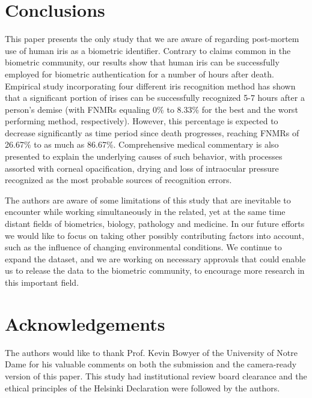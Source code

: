 \documentclass[10pt,twocolumn,letterpaper]{article}
\begin{document}


\section{Conclusions}
This paper presents the only study that we are aware of regarding post-mortem use of human iris as a biometric identifier. Contrary to claims common in the biometric community, our results show that human iris can be successfully employed for biometric authentication for a number of hours after death. Empirical study incorporating four different iris recognition method has shown that a significant portion of irises can be successfully recognized 5-7 hours after a person's demise (with FNMRs equaling 0\% to 8.33\% for the best and the worst performing method, respectively). However, this percentage is expected to decrease significantly as time period since death progresses, reaching FNMRs of 26.67\% to as much as 86.67\%. Comprehensive medical commentary is also presented to explain the underlying causes of such behavior, with processes assorted with corneal opacification, drying and loss of intraocular pressure recognized as the most probable sources of recognition errors.

The authors are aware of some limitations of this study that are inevitable to encounter while working simultaneously in the related, yet at the same time distant fields of biometrics, biology, pathology and medicine. In our future efforts we would like to focus on taking other possibly contributing factors into account, such as the influence of changing environmental conditions. We continue to expand the dataset, and we are working on necessary approvals that could enable us to release the data to the biometric community, to encourage more research in this important field.


\section{Acknowledgements}
The authors would like to thank Prof. Kevin Bowyer of the University of Notre Dame for his valuable comments on both the submission and the camera-ready version of this paper. This study had institutional review board clearance and the ethical principles of the Helsinki Declaration were followed by the authors.


{\small


}
\end{document}
